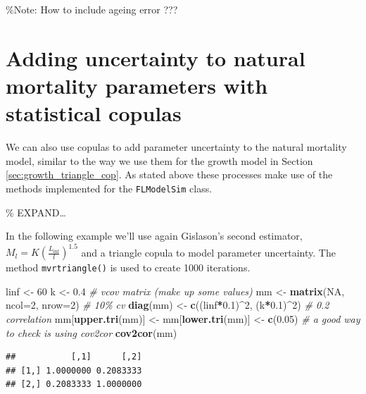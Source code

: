 \documentclass[
]{book}
\newenvironment{Shaded}{\begin{snugshade}}{\end{snugshade}}
\newcommand{\AttributeTok}[1]{\textcolor[rgb]{0.13,0.29,0.53}{#1}}
\newcommand{\CommentTok}[1]{\textcolor[rgb]{0.56,0.35,0.01}{\textit{#1}}}
\newcommand{\ConstantTok}[1]{\textcolor[rgb]{0.56,0.35,0.01}{#1}}
\newcommand{\DecValTok}[1]{\textcolor[rgb]{0.00,0.00,0.81}{#1}}
\newcommand{\FloatTok}[1]{\textcolor[rgb]{0.00,0.00,0.81}{#1}}
\newcommand{\FunctionTok}[1]{\textcolor[rgb]{0.13,0.29,0.53}{\textbf{#1}}}
\newcommand{\NormalTok}[1]{#1}
\newcommand{\OtherTok}[1]{\textcolor[rgb]{0.56,0.35,0.01}{#1}}
\newcommand{\SpecialCharTok}[1]{\textcolor[rgb]{0.81,0.36,0.00}{\textbf{#1}}}
\begin{document}
\%Note: How to include ageing error ???

\hypertarget{adding-uncertainty-to-natural-mortality-parameters-with-statistical-copulas}{%
\section{Adding uncertainty to natural mortality parameters with statistical copulas}\label{adding-uncertainty-to-natural-mortality-parameters-with-statistical-copulas}}

We can also use copulas to add parameter uncertainty to the natural mortality model, similar to the way we use them for the growth model in Section \ref{sec:growth_triangle_cop}. As stated above these processes make use of the methods implemented for the \texttt{FLModelSim} class.

\% EXPAND\ldots{}

In the following example we'll use again Gislason's second estimator, \(M_l=K(\frac{L_{\inf}}{l})^{1.5}\) and a triangle copula to model parameter uncertainty. The method \texttt{mvrtriangle()} is used to create 1000 iterations.

\begin{Shaded}
\begin{Highlighting}[]
\NormalTok{linf }\OtherTok{\textless{}{-}} \DecValTok{60}
\NormalTok{k }\OtherTok{\textless{}{-}} \FloatTok{0.4}
\CommentTok{\# vcov matrix (make up some values)}
\NormalTok{mm }\OtherTok{\textless{}{-}} \FunctionTok{matrix}\NormalTok{(}\ConstantTok{NA}\NormalTok{, }\AttributeTok{ncol=}\DecValTok{2}\NormalTok{, }\AttributeTok{nrow=}\DecValTok{2}\NormalTok{)}
\CommentTok{\# 10\% cv}
\FunctionTok{diag}\NormalTok{(mm) }\OtherTok{\textless{}{-}} \FunctionTok{c}\NormalTok{((linf}\SpecialCharTok{*}\FloatTok{0.1}\NormalTok{)}\SpecialCharTok{\^{}}\DecValTok{2}\NormalTok{, (k}\SpecialCharTok{*}\FloatTok{0.1}\NormalTok{)}\SpecialCharTok{\^{}}\DecValTok{2}\NormalTok{)}
\CommentTok{\# 0.2 correlation}
\NormalTok{mm[}\FunctionTok{upper.tri}\NormalTok{(mm)] }\OtherTok{\textless{}{-}}\NormalTok{ mm[}\FunctionTok{lower.tri}\NormalTok{(mm)] }\OtherTok{\textless{}{-}} \FunctionTok{c}\NormalTok{(}\FloatTok{0.05}\NormalTok{)}
\CommentTok{\# a good way to check is using cov2cor}
\FunctionTok{cov2cor}\NormalTok{(mm)}
\end{Highlighting}
\end{Shaded}

\begin{verbatim}
##           [,1]      [,2]
## [1,] 1.0000000 0.2083333
## [2,] 0.2083333 1.0000000
\end{verbatim}
\end{document}
